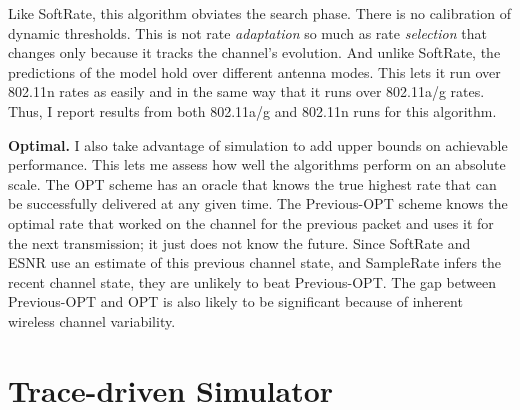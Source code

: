 Like SoftRate, this algorithm obviates the search phase. There is no calibration of dynamic thresholds. This is not rate \emph{adaptation} so much as rate \emph{selection} that changes only because it tracks the channel's evolution. And unlike SoftRate, the predictions of the model hold over different antenna modes. This lets it run over 802.11n rates as easily and in the same way that it runs over 802.11a/g rates. Thus, I report results from both 802.11a/g and 802.11n runs for this algorithm.

\textbf{Optimal.} I also take advantage of simulation to add upper bounds on achievable performance. This lets me assess how well the algorithms perform on an absolute scale. The OPT scheme has an oracle that knows the true highest rate that can be successfully delivered at any given time. The Previous-OPT scheme knows the optimal rate that worked on the channel for the previous packet and uses it for the next transmission; it just does not know the future. Since SoftRate and ESNR use an estimate of this previous channel state, and SampleRate infers the recent channel state, they are unlikely to beat Previous-OPT. The gap between Previous-OPT and OPT is also likely to be significant because of inherent wireless channel variability.


\section{Trace-driven Simulator}



